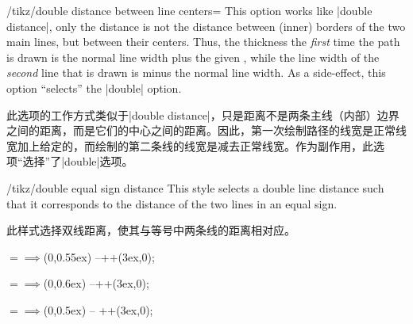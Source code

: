 \begin{key}{/tikz/double distance between line centers=}
    This option works like |double distance|, only the distance is not the
    distance between (inner) borders of the two main lines, but between their
    centers. Thus, the thickness the \emph{first} time the path is drawn is the
    normal line width plus the given , while the line width of
    the \emph{second} line that is drawn is  minus the normal
    line width. As a side-effect, this option ``selects'' the |double| option.
    
    此选项的工作方式类似于|double distance|，只是距离不是两条主线（内部）边界之间的距离，而是它们的中心之间的距离。因此，第一次绘制路径的线宽是正常线宽加上给定的，而绘制的第二条线的线宽是减去正常线宽。作为副作用，此选项“选择”了|double|选项。
\begin{codeexample}[]
\end{codeexample}
\begin{codeexample}[]
\end{codeexample}
\end{key}

\begin{stylekey}{/tikz/double equal sign distance}
    This style selects a double line distance such that it corresponds to the
    distance of the two lines in an equal sign.
    
    此样式选择双线距离，使其与等号中两条线的距离相对应。

\begin{codeexample}[
    preamble={\usepackage{amsmath}
\usetikzlibrary{arrows.meta}}
]
\Huge $=\implies$
                    (0,0.55ex) --++(3ex,0);
\end{codeexample}
\begin{codeexample}[
    preamble={\usepackage{amsmath}
\usetikzlibrary{arrows.meta}}
]
\normalsize $=\implies$
                          (0,0.6ex) --++(3ex,0);
\end{codeexample}
\begin{codeexample}[
    preamble={\usepackage{amsmath}
\usetikzlibrary{arrows.meta}}
]
\tiny $=\implies$
                   (0,0.5ex) -- ++(3ex,0);
\end{codeexample}
\end{stylekey}


